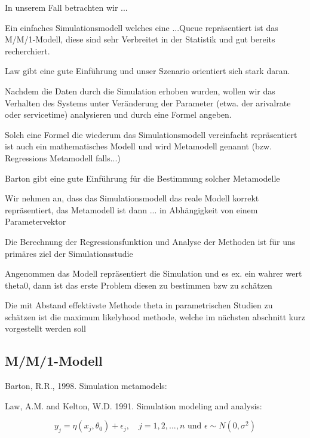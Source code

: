 In unserem Fall betrachten wir ...

Ein einfaches Simulationsmodell welches eine ...Queue repräsentiert ist das M/M/1-Modell, diese sind sehr Verbreitet in der Statistik und gut bereits recherchiert.

Law gibt eine gute Einführung und unser Szenario orientiert sich stark daran.

Nachdem die Daten durch die Simulation erhoben wurden, wollen wir das Verhalten des Systems unter Veränderung der Parameter (etwa. der arivalrate oder servicetime) analysieren und durch eine Formel angeben.

Solch eine Formel die wiederum das Simulationsmodell vereinfacht repräsentiert ist auch ein mathematisches Modell und wird Metamodell genannt (bzw. Regressions Metamodell falls...)

Barton gibt eine gute Einführung für die Bestimmung solcher Metamodelle

Wir nehmen an, dass das Simulationsmodell das reale Modell korrekt repräsentiert, das Metamodell ist dann ... in Abhängigkeit von einem Parametervektor

Die Berechnung der Regressionsfunktion und Analyse der Methoden ist für uns primäres ziel der Simulationsstudie

Angenommen das Modell repräsentiert die Simulation und es ex. ein wahrer wert theta0, dann ist das erste Problem diesen zu bestimmen bzw zu schätzen

Die mit Abstand effektivste Methode theta in parametrischen Studien zu schätzen ist die maximum likelyhood methode, welche im nächsten abschnitt kurz vorgestellt werden soll

\subsection{M/M/1-Modell}


Barton,  R.R.,  1998.  Simulation  metamodels:

Law,  A.M.  and  Kelton,  W.D.  1991.  Simulation  modeling  and analysis:


\begin{equation}
y_j = \eta(x_j, \theta_0) + \epsilon_j, 
\quad j=1,2,...,n \text{ und } \epsilon \sim N(0, \sigma^2)
\end{equation}

